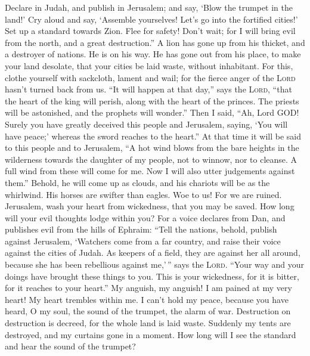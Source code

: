  Declare in Judah, and publish in Jerusalem; and say,
`Blow the trumpet in the land!' Cry aloud and say, `Assemble yourselves!
Let's go into the fortified cities!'  Set up a standard
towards Zion. Flee for safety! Don't wait; for I will bring evil from
the north, and a great destruction.''  A lion has gone up
from his thicket, and a destroyer of nations. He is on his way. He has
gone out from his place, to make your land desolate, that your cities be
laid waste, without inhabitant.  For this, clothe yourself
with sackcloth, lament and wail; for the fierce anger of the
\textsc{Lord} hasn't turned back from us.  ``It will
happen at that day,'' says the \textsc{Lord}, ``that the heart of the
king will perish, along with the heart of the princes. The priests will
be astonished, and the prophets will wonder.''  Then I
said, ``Ah, Lord GOD! Surely you have greatly deceived this people and
Jerusalem, saying, `You will have peace;' whereas the sword reaches to
the heart.''  At that time it will be said to this people
and to Jerusalem, ``A hot wind blows from the bare heights in the
wilderness towards the daughter of my people, not to winnow, nor to
cleanse.  A full wind from these will come for me. Now I
will also utter judgements against them.''  Behold, he
will come up as clouds, and his chariots will be as the whirlwind. His
horses are swifter than eagles. Woe to us! For we are ruined.
 Jerusalem, wash your heart from wickedness, that you may
be saved. How long will your evil thoughts lodge within you?
 For a voice declares from Dan, and publishes evil from
the hills of Ephraim:  ``Tell the nations, behold,
publish against Jerusalem, `Watchers come from a far country, and raise
their voice against the cities of Judah.  As keepers of a
field, they are against her all around, because she has been rebellious
against me,'\,'' says the \textsc{Lord}.  ``Your way and
your doings have brought these things to you. This is your wickedness,
for it is bitter, for it reaches to your heart.''  My
anguish, my anguish! I am pained at my very heart! My heart trembles
within me. I can't hold my peace, because you have heard, O my soul, the
sound of the trumpet, the alarm of war.  Destruction on
destruction is decreed, for the whole land is laid waste. Suddenly my
tents are destroyed, and my curtains gone in a moment. 
How long will I see the standard and hear the sound of the trumpet?
